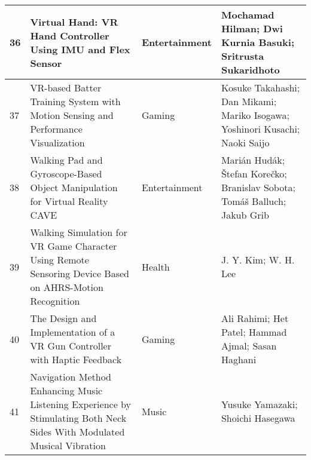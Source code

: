 \begin{landscape}
\begin{table}[]
{\begin{tabular}{|l|l|l|l|}
				36                               & Virtual Hand: VR Hand Controller Using IMU and Flex Sensor                                                                                & Entertainment                            & Mochamad Hilman; Dwi Kurnia Basuki; Sritrusta Sukaridhoto                                                                       \\ \hline
				37                               & VR-based Batter Training System with Motion Sensing and Performance Visualization                                                         & Gaming                                   & Kosuke Takahashi; Dan Mikami; Mariko Isogawa; Yoshinori Kusachi; Naoki Saijo                                                    \\ \hline
				38                               & Walking Pad and Gyroscope-Based Object Manipulation for Virtual Reality CAVE                                                              & Entertainment                            & Marián Hudák; Štefan Korečko; Branislav Sobota; Tomáš Balluch; Jakub Grib                                                             \\ \hline
				39                               & Walking Simulation for VR Game Character Using Remote Sensoring Device Based on AHRS-Motion Recognition                                   & Health                                   & J. Y. Kim; W. H. Lee                                                       \\ \hline
				40                               & The Design and Implementation of a VR Gun Controller with Haptic Feedback                                                                 & Gaming                                   & Ali Rahimi; Het Patel; Hammad Ajmal; Sasan Haghani
				                                                 \\ \hline
				41                               & Navigation Method Enhancing Music Listening Experience by Stimulating Both Neck Sides With Modulated Musical Vibration                    & Music                                    & Yusuke Yamazaki; Shoichi Hasegawa                                                                    \\ \hline
			\end{tabular}%
		}
	\end{table}
\end{landscape}